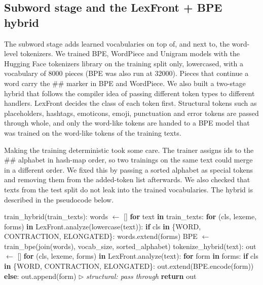 \documentclass{ieeeaccess}
\begin{document}
\subsection{Subword stage and the LexFront + BPE hybrid}\label{sec:3.6}
The subword stage adds learned vocabularies on top of, and next to, the word-level tokenizers. We trained BPE, WordPiece and Unigram models with the Hugging Face tokenizers library on the training split only, lowercased, with a vocabulary of 8000 pieces (BPE was also run at 32000). Pieces that continue a word carry the \#\# marker in BPE and WordPiece. We also built a two-stage hybrid that follows the compiler idea of passing different token types to different handlers. LexFront decides the class of each token first. Structural tokens such as placeholders, hashtags, emoticons, emoji, punctuation and error tokens are passed through whole, and only the word-like tokens are handed to a BPE model that was trained on the word-like tokens of the training texts.

Making the training deterministic took some care. The trainer assigns ids to the \#\# alphabet in hash-map order, so two trainings on the same text could merge in a different order. We fixed this by passing a sorted alphabet as special tokens and removing them from the added-token list afterwards. We also checked that texts from the test split do not leak into the trained vocabularies. The hybrid is described in the pseudocode below.

\begin{algorithm}[!tb]
\scriptsize
\caption{LexFront + BPE hybrid tokenizer}\label{alg:5}
\begin{algorithmic}[1]
\State train\_hybrid(train\_texts):
\State \hspace*{1.0em}words $\leftarrow$ []
\State \hspace*{1.0em}\textbf{for} text \textbf{in} train\_texts:
\State \hspace*{2.0em}\textbf{for} (cls, lexeme, forms) \textbf{in} LexFront.analyze(lowercase(text)):
\State \hspace*{3.0em}\textbf{if} cls \textbf{in} \{WORD, CONTRACTION, ELONGATED\}: words.extend(forms)
\State \hspace*{1.0em}BPE $\leftarrow$ train\_bpe(join(words), vocab\_size, sorted\_alphabet)
\State tokenize\_hybrid(text):
\State \hspace*{1.0em}out $\leftarrow$ []
\State \hspace*{1.0em}\textbf{for} (cls, lexeme, forms) \textbf{in} LexFront.analyze(text):
\State \hspace*{2.0em}\textbf{for} form \textbf{in} forms:
\State \hspace*{3.0em}\textbf{if} cls \textbf{in} \{WORD, CONTRACTION, ELONGATED\}:
\State \hspace*{4.0em}out.extend(BPE.encode(form))
\State \hspace*{3.0em}\textbf{else}:
\State \hspace*{4.0em}out.append(form) \hfill{\scriptsize$\triangleright$ \textit{structural: pass through}}
\State \hspace*{1.0em}\textbf{return} out
\end{algorithmic}
\end{algorithm}
\end{document}
